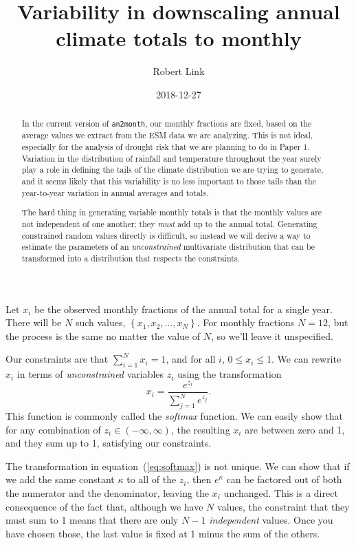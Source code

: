 \documentclass[11pt]{article}
\begin{document}
\title{Variability in downscaling annual climate totals to monthly}
\author{Robert Link}
\date{2018-12-27}
\maketitle

\begin{abstract}
In the current version of \texttt{an2month}, our monthly fractions are
fixed, based on the average values we extract from the ESM data we are
analyzing.  This is not ideal, especially for the analysis of drought
risk that we are planning to do in Paper 1.  Variation in the
distribution of rainfall and temperature throughout the year surely
play a role in defining the tails of the climate distribution we are
trying to generate, and it seems likely that this variability is no
less important to those tails than the year-to-year variation in
annual averages and totals.

The hard thing in generating variable monthly totals is that the
monthly values are not independent of one another; they \emph{must}
add up to the annual total.  Generating constrained random values
directly is difficult, so instead we will derive a way to estimate the
parameters of an \emph{unconstrained} multivariate distribution that
can be transformed into a distribution that respects the constraints.
\end{abstract}

Let $x_i$ be the observed monthly fractions of the annual total for a
single year. There will be $N$ such values,
$\left\lbrace x_1, x_2, \ldots, x_N\right\rbrace$.
For monthly fractions $N=12$, but the process is the same no matter
the value of $N$, so we'll leave it unspecified.

Our constraints are that $\sum_{i=1}^{N} x_i = 1$, and for all $i$,
$0 \le x_i \le 1$.  We can rewrite $x_i$ in terms of
\emph{unconstrained} variables $z_i$ using the transformation
\begin{equation}
  \label{eq:softmax}
  x_i = \frac{e^{z_i}}{\sum_{j=1}^{N} e^{z_j}}.
\end{equation}
This function is commonly called the \emph{softmax} function.  We can
easily show that for any combination of $z_i \in (-\infty, \infty)$,
the resulting $x_i$ are between zero and 1, and they sum up to 1,
satisfying our constraints.

The transformation in equation~(\ref{eq:softmax}) is not unique.  We
can show that if we add the same constant $\kappa$ to all of the
$z_i$, then $e^\kappa$ can be factored out of both the numerator and
the denominator, leaving the $x_i$ unchanged.  This is a direct
consequence of the fact that, although we have $N$ values, the
constraint that they must sum to 1 means that there are only $N-1$
\emph{independent} values.  Once you have chosen those, the last value
is fixed at 1 minus the sum of the others.
\end{document}
